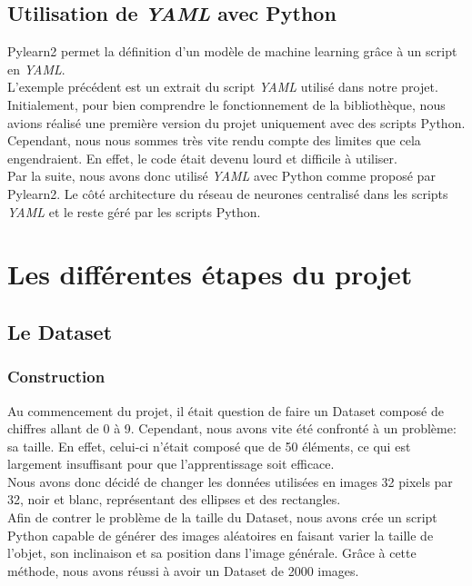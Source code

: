 \documentclass[12pt, a4paper]{article}
\begin{document}
\subsection{Utilisation de \emph{YAML} avec Python}
Pylearn2 permet la définition d'un modèle de machine learning grâce à un script en \emph{YAML}.\\ L'exemple précédent est un extrait du script \emph{YAML} utilisé dans notre projet. 
\\

Initialement, pour bien comprendre le fonctionnement de la bibliothèque, nous avions réalisé une première version du projet uniquement avec des scripts Python. 
\\ Cependant, nous nous sommes très vite rendu compte des limites que cela engendraient. En effet, le code était devenu lourd et difficile à utiliser. 
\\

Par la suite, nous avons donc utilisé \emph{YAML} avec Python comme proposé par Pylearn2. Le côté architecture du réseau de neurones centralisé dans les scripts \emph{YAML} et le reste géré par les scripts Python. 

\section{Les différentes étapes du projet}
	\subsection{Le Dataset}
		\subsubsection{Construction}
Au commencement du projet, il était question de faire un Dataset composé de chiffres allant de 0 à 9. 
Cependant, nous avons vite été confronté à un problème: sa taille. En effet, celui-ci n'était composé que de 50 éléments, ce qui est largement insuffisant pour que l'apprentissage soit efficace.
\\

 Nous avons donc décidé de changer les données utilisées en images 32 pixels par 32, noir et blanc, représentant des ellipses et des rectangles.
\\Afin de contrer le problème de la taille du Dataset, nous avons crée un script Python capable de générer des images aléatoires en faisant varier la taille de l'objet, son inclinaison et sa position dans l'image générale. Grâce à cette méthode, nous avons réussi à avoir un Dataset de 2000 images. 
\end{document}
